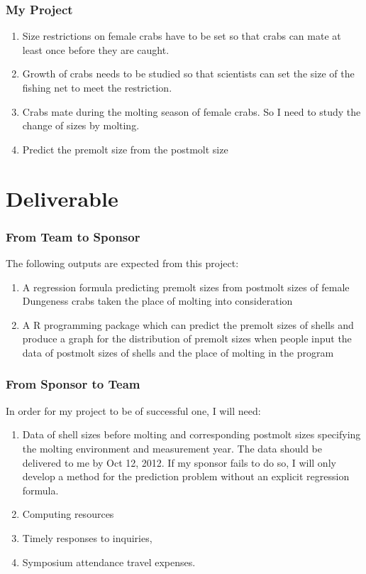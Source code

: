 \documentclass[compress,handout,10pt]{beamer}
\let\olditem\item
\renewcommand{\item}{\setlength{\itemsep}{0.5\baselineskip}\olditem}
\begin{document}
\begin{frame}
    \frametitle{My Project}
     \begin{enumerate}
         \item Size restrictions on female crabs have to be set so that crabs can mate at least once before they are caught.
         \item Growth of crabs needs to be studied so that scientists can set the size of the fishing net to meet the restriction.
         \item Crabs mate during the molting season of female crabs. So I need to study the change of sizes by molting.
         \item Predict the premolt size from the postmolt size
     \end{enumerate}
\end{frame}

\section{Deliverable}

\begin{frame}
    \frametitle{From Team to Sponsor}
    The following outputs are expected from this project:
     \begin{enumerate}
         \item A regression formula predicting premolt sizes from postmolt sizes of female Dungeness crabs taken the place of molting into consideration
         \item A R programming package which can predict the premolt sizes of shells and produce a graph for the distribution of premolt sizes when people input the data of postmolt sizes of shells and the place of molting in the program
     \end{enumerate}
\end{frame}

\begin{frame}
    \frametitle{From Sponsor to Team}
    In order for my project to be of successful one, I will need:
     \begin{enumerate}
         \item Data of shell sizes before molting and corresponding postmolt sizes specifying the molting environment and measurement year. The data should be delivered to me by Oct 12, 2012. If my sponsor fails to do so, I will only develop a method for the prediction problem without an explicit regression formula.
         \item Computing resources
         \item Timely responses to inquiries, 
         \item Symposium attendance travel expenses.
     \end{enumerate}
\end{frame}
\end{document}
